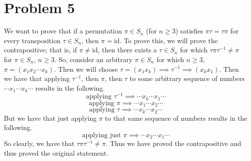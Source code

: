 \documentclass{article}
\begin{document}
\section*{Problem 5}
We want to prove that if a permutation $\pi \in S_n$ (for $n \geq 3$) satisfies
$\pi \tau = \tau \pi$ for every transposition $\tau \in S_n$, then
$\pi = \text{id}$. To prove this, we will prove the contrapositive; that is,
if $\pi \neq \text{id}$, then there exists a $\tau \in S_n$ for which
$\tau \pi \tau^{-1} \neq \pi$ for $\pi \in S_n$, $n \geq 3$.
So, consider an arbitrary $\pi \in S_n$ for
which $n \geq 3$, $\pi = (x_1x_2\cdots x_k)$. Then we will choose
$\tau = (x_1x_k) \implies \tau^{-1} \implies (x_kx_1)$. Then we have that
applying $\tau^{-1}$, then $\pi$, then $\tau$ to some arbitrary sequence of
numbers $\cdots x_1 \cdots x_k \cdots$ results in the following.
\[ \text{applying } \tau^{-1} \implies \cdots x_k \cdots x_1 \cdots \]
\[ \text{applying } \pi \implies \cdots x_1 \cdots x_2 \cdots \]
\[ \text{applying } \tau \implies \cdots x_k \cdots x_2 \cdots \]
But we have that just applying $\pi$ to that same sequence of numbers
results in the following.
\[ \text{applying just } \pi \implies \cdots x_2 \cdots x_1 \cdots \]
So clearly, we have that $\tau \pi \tau^{-1} \neq \pi$. Thus we have
proved the contrapositive and thus proved the original statement.
\end{document}
